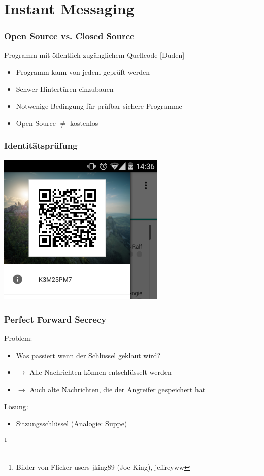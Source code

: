 \section{Instant Messaging}


\begin{frame}
  \frametitle{Open Source vs. Closed Source}
  \begin{definition}
   Programm mit öffentlich zugänglichem Quellcode \hfill \tiny [Duden]
  \end{definition}

  \begin{itemize}
   \item Programm kann von jedem geprüft werden
   \item Schwer Hintertüren einzubauen
   \item Notwenige Bedingung für prüfbar sichere Programme
   \item Open Source $\neq$ kostenlos
  \end{itemize}
\end{frame}

\begin{frame}
  \frametitle{Identitätsprüfung}
  \center
  \includegraphics[width=0.6\textwidth]{figures/Threema_ID.png}
\end{frame}

\begin{frame}
  \frametitle{Perfect Forward Secrecy}
  Problem:
  \begin{itemize}
    \item Was passiert wenn der Schlüssel geklaut wird?
    \pause
    \item $\rightarrow$ Alle Nachrichten können entschlüsselt werden
    \item $\rightarrow$ Auch alte Nachrichten, die der Angreifer gespeichert hat
  \end{itemize}
  \pause
  Lösung:
  \begin{itemize}
    \item Sitzungsschlüssel (Analogie: Suppe)
  \end{itemize}
  \center {}\let\thefootnote\relax\footnote{Bilder von Flicker users jking89 (Joe King), jeffreyww}
\end{frame}

